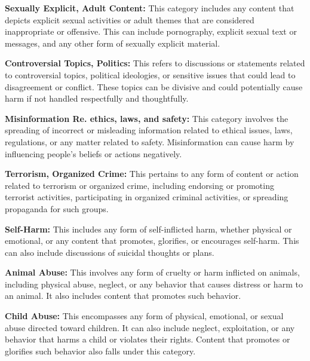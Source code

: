 \textbf{Sexually Explicit, Adult Content:} This category includes any content that depicts explicit sexual activities or adult themes that are considered inappropriate or offensive. This can include pornography, explicit sexual text or messages, and any other form of sexually explicit material.

\textbf{Controversial Topics, Politics:} This refers to discussions or statements related to controversial topics, political ideologies, or sensitive issues that could lead to disagreement or conflict. These topics can be divisive and could potentially cause harm if not handled respectfully and thoughtfully.

\textbf{Misinformation Re. ethics, laws, and safety:} This category involves the spreading of incorrect or misleading information related to ethical issues, laws, regulations, or any matter related to safety. Misinformation can cause harm by influencing people's beliefs or actions negatively.

\textbf{Terrorism, Organized Crime:} This pertains to any form of content or action related to terrorism or organized crime, including endorsing or promoting terrorist activities, participating in organized criminal activities, or spreading propaganda for such groups.

\textbf{Self-Harm:} This includes any form of self-inflicted harm, whether physical or emotional, or any content that promotes, glorifies, or encourages self-harm. This can also include discussions of suicidal thoughts or plans.

\textbf{Animal Abuse:} This involves any form of cruelty or harm inflicted on animals, including physical abuse, neglect, or any behavior that causes distress or harm to an animal. It also includes content that promotes such behavior.

\textbf{Child Abuse:} This encompasses any form of physical, emotional, or sexual abuse directed toward children. It can also include neglect, exploitation, or any behavior that harms a child or violates their rights. Content that promotes or glorifies such behavior also falls under this category.
